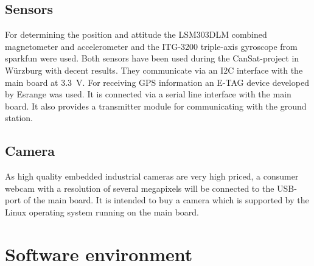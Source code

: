 \subsection*{Sensors}

For determining the position and attitude the LSM303DLM \cite{LSM303:datasheet}
combined magnetometer and accelerometer and the ITG-3200 triple-axis gyroscope
\cite{ITG-3200:datasheet} from sparkfun were used. Both sensors have been used
during the CanSat-project in Würzburg with decent results. They communicate
via an I2C interface with the main board at 3.3~V. For receiving GPS
information an E-TAG device developed by Esrange was
used. It is connected via a serial line interface with the main board. It also
provides a transmitter module for communicating with the ground station.

\subsection*{Camera}

As high quality embedded industrial cameras are very high priced, a consumer
webcam with a resolution of several megapixels will be connected to the USB-port
of the main board. It is intended to buy a camera which is supported by the
Linux operating system running on the main board.


\FloatBarrier
\section{Software environment}

